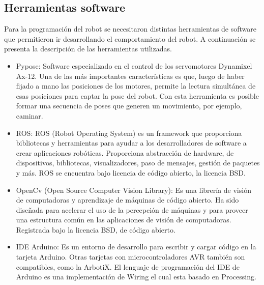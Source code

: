 \label{chapter:busqueda}

\subsection{Herramientas software }

Para la programación del robot se necesitaron distintas herramientas de software que permitieron ir desarrollando el comportamiento del robot. A continuación se presenta la descripción de las herramientas utilizadas. 

\begin{itemize}
\item Pypose: Software especializado en el control de los servomotores Dynamixel Ax-12. Una de las más importantes características es que, luego de haber fijado a mano las posiciones de los motores, permite la lectura simultánea de esas posiciones para captar la pose del robot. Con esta herramienta es posible formar una secuencia de poses que generen un movimiento, por ejemplo, caminar. \cite{pypose}

\item ROS: ROS (Robot Operating System) es un framework que proporciona bibliotecas y herramientas para ayudar a los desarrolladores de software a crear aplicaciones robóticas. Proporciona abstracción de hardware,  de dispositivos, bibliotecas, visualizadores, paso de mensajes, gestión de paquetes y más. ROS se encuentra bajo licencia de código abierto, la licencia BSD.

\item OpenCv (Open Source Computer Vision Library): Es una librería de visión de computadoras y aprendizaje de máquinas de código abierto. Ha sido diseñada para acelerar el uso de la percepción de m\'aquinas y para proveer una estructura común en las aplicaciones de visión de computadoras. Registrada bajo la licencia BSD, de código abierto. \cite{opencv}

\item IDE Arduino: Es un entorno de desarrollo para escribir y cargar código en la tarjeta Arduino. Otras tarjetas con microcontroladores AVR también son compatibles, como la ArbotiX. El lenguaje de programación del IDE de Arduino es una implementación de Wiring el cual esta basado en Processing.  \cite{arduino}

\end{itemize}

